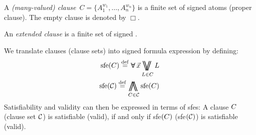 \documentclass{article}
\begin{document}
\begin{definition}
A {\em (many-valued) clause~$C = \{ A_1^{w_1}, \ldots, A_n^{w_n}\}$} is a
finite set of signed atoms (proper clause).
The empty clause is denoted by $\Box$.

An {\em extended clause} is a finite set of signed \formulae.
\end{definition}

\begin{definition}
We translate clauses (clause sets) into signed formula expression by
defining:
\begin{eqnarray*}
   \mbox{sfe}(\Clause) \defeq \sall \vec{x} \Sor_{L \in \Clause} L \\
   \mbox{sfe}({\ClauseSet}) \defeq \Sand_{\Clause \in \ClauseSet}
   \mbox{sfe}(\Clause)
\end{eqnarray*}
Satisfiability and validity can then be expressed in terms of sfes:
A clause $C$ (clause set ${\cal C}$) is satisfiable (valid),
if and only if sfe$(C)$ (sfe$({\cal C})$) is satisfiable (valid).
\end{definition}
\end{document}
